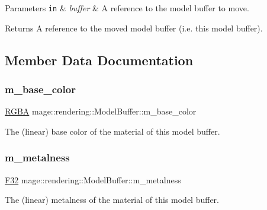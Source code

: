\begin{DoxyParams}[1]{Parameters}
\mbox{\tt in}  & {\em buffer} & A reference to the model buffer to move. \\
\hline
\end{DoxyParams}
\begin{DoxyReturn}{Returns}
A reference to the moved model buffer (i.\+e. this model buffer). 
\end{DoxyReturn}


\subsection{Member Data Documentation}
\hypertarget{structmage_1_1rendering_1_1_model_buffer_a82c9d6dfd303c1a37c621e3fc4520232}{}\label{structmage_1_1rendering_1_1_model_buffer_a82c9d6dfd303c1a37c621e3fc4520232} 
\subsubsection{\texorpdfstring{m\+\_\+base\+\_\+color}{m\_base\_color}}
{\footnotesize\ttfamily \hyperlink{structmage_1_1_r_g_b_a}{R\+G\+BA} mage\+::rendering\+::\+Model\+Buffer\+::m\+\_\+base\+\_\+color}

The (linear) base color of the material of this model buffer. \hypertarget{structmage_1_1rendering_1_1_model_buffer_a4004bcf0d3fe8d0a5596d801d98c438a}{}\label{structmage_1_1rendering_1_1_model_buffer_a4004bcf0d3fe8d0a5596d801d98c438a} 
\subsubsection{\texorpdfstring{m\+\_\+metalness}{m\_metalness}}
{\footnotesize\ttfamily \hyperlink{namespacemage_aa97e833b45f06d60a0a9c4fc22ae02c0}{F32} mage\+::rendering\+::\+Model\+Buffer\+::m\+\_\+metalness}

The (linear) metalness of the material of this model buffer. \hypertarget{structmage_1_1rendering_1_1_model_buffer_a50a4684ae6f0139edc0108971249113a}{}\label{structmage_1_1rendering_1_1_model_buffer_a50a4684ae6f0139edc0108971249113a} 
